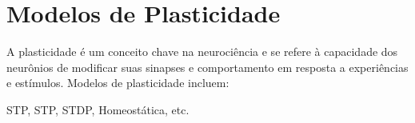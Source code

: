 \section{Modelos de Plasticidade}



A plasticidade é um conceito chave na neurociência e se refere à capacidade dos neurônios de modificar suas sinapses e
comportamento em resposta a experiências e estímulos. Modelos de plasticidade incluem:

STP, STP, STDP, Homeostática, etc.


